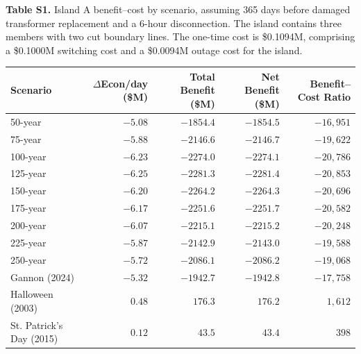 \documentclass[draft]{agutexSI2019}
\begin{document}
\begin{center}
\textbf{Table S1.} Island A benefit--cost by scenario, assuming 365 days before damaged transformer replacement and a 6-hour disconnection. The island contains three members with two cut boundary lines. The one-time cost is \$0.1094M, comprising a \$0.1000M switching cost and a \$0.0094M outage cost for the island.\\[6pt]
\footnotesize
\begin{tabular}{lrrrr}
\hline
Scenario & $\Delta$Econ/day (\$M) & Total Benefit (\$M) & Net Benefit (\$M) & Benefit--Cost Ratio \\
\hline
50-year            & $-5.08$ & $-1854.4$ & $-1854.5$ & $-16{,}951$ \\
75-year            & $-5.88$ & $-2146.6$ & $-2146.7$ & $-19{,}622$ \\
100-year           & $-6.23$ & $-2274.0$ & $-2274.1$ & $-20{,}786$ \\
125-year           & $-6.25$ & $-2281.3$ & $-2281.4$ & $-20{,}853$ \\
150-year           & $-6.20$ & $-2264.2$ & $-2264.3$ & $-20{,}696$ \\
175-year           & $-6.17$ & $-2251.6$ & $-2251.7$ & $-20{,}582$ \\
200-year           & $-6.07$ & $-2215.1$ & $-2215.2$ & $-20{,}248$ \\
225-year           & $-5.87$ & $-2142.9$ & $-2143.0$ & $-19{,}588$ \\
250-year           & $-5.72$ & $-2086.1$ & $-2086.2$ & $-19{,}068$ \\
Gannon (2024)      & $-5.32$ & $-1942.7$ & $-1942.8$ & $-17{,}758$ \\
Halloween (2003)   & $0.48$  & $176.3$   & $176.2$   & $1{,}612$   \\
St. Patrick's Day (2015) & $0.12$ & $43.5$ & $43.4$ & $398$ \\
\hline
\end{tabular}
\end{center}

\vspace{18pt}
\end{document}
